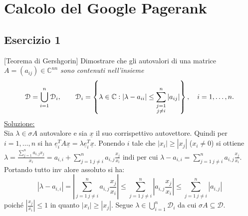 \chapter{Calcolo del Google Pagerank}
\label{chap:Google}

\section{Esercizio 1}
\label{sub:Es1}
[Teorema di Gershgorin]
      Dimostrare che gli autovalori di una matrice
      $A=(a_{ij})\in\mathbb{C}^{n n}$
      \emph{sono contenuti nell'insieme}
			\[
				\mathcal{D}=\bigcup_{i=1}^n\mathcal{D}_i,\qquad \mathcal{D}_i=\left\{\lambda\in\mathbb{C}:|\lambda-a_{ii}|\leq\sum_{\begin{subarray}{c}
					j=1\\
					j\neq i
				\end{subarray}}^n|a_{ij}|\right\},\quad i=1,\dots,n.
			\]
\underline{Soluzione:}\\
Sia $\lambda\in\sigma{A}$ autovalore e sia $\underline{x}$ il suo corrispettivo autovettore.
Quindi per $i=1,\ldots,n$ si ha  $\underline{e}_i^TA\underline{x}=\lambda\underline{e}_i^T\underline{x}$.
Ponendo $i$ tale che
$|x_i|\geq|x_j|$ ($x_i\neq 0$) si ottiene $\lambda=\frac{\sum_{j=1}^n{a_{i,j}x_j}}{x_i}=a_{i,i}+\sum_{j=1\: j\neq i}^n{a_{i,j}\frac{x_j}{x_i}}$
indi per cui $\lambda-a_{i,i}=\sum_{j=1\: j\neq i}^n{a_{i,j}\frac{x_j}{x_i}}$.
Portando tutto inv alore assoluto si ha:
$$\left|\lambda-a_{i,i}\right|=\left|\sum_{j=1\: j\neq i}^n{a_{i,j}\frac{x_j}{x_i}}\right|\leq\sum_{j=1\: j\neq i}^n{\left|a_{i,j}\frac{x_j}{x_i}\right|}\leq\sum_{j=1\: j\neq i}^n{\left|a_{i,j}\right|}$$ poiché $\left|\frac{x_j}{x_i}\right|\leq 1$ in quanto $|x_i|\geq|x_j|$.
Segue $\lambda\in\bigcup_{i=1}^{n}{\mathcal{D}_i}$ da cui $\sigma{A}\subseteq\mathcal{D}$.
